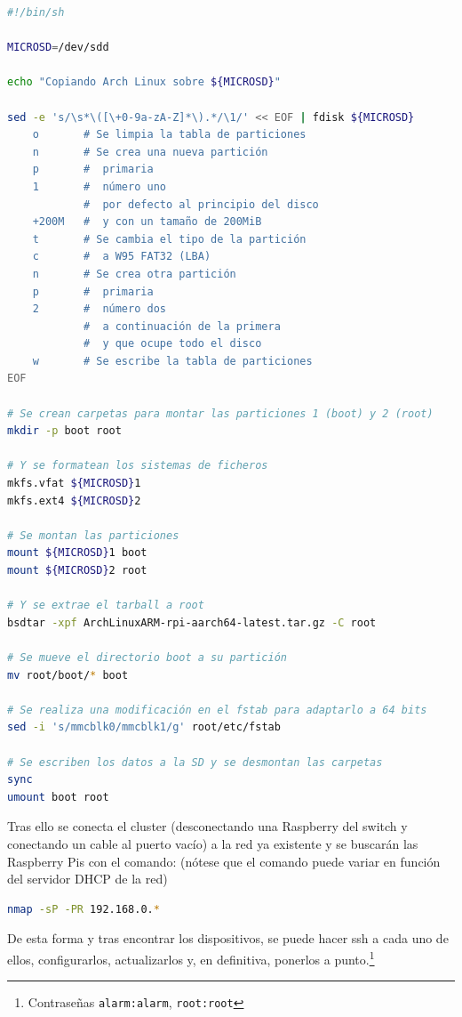 \begin{lstlisting}[language=bash]
#!/bin/sh

MICROSD=/dev/sdd

echo "Copiando Arch Linux sobre ${MICROSD}"

sed -e 's/\s*\([\+0-9a-zA-Z]*\).*/\1/' << EOF | fdisk ${MICROSD}
    o       # Se limpia la tabla de particiones
    n       # Se crea una nueva partición
    p       #  primaria
    1       #  número uno
            #  por defecto al principio del disco
    +200M   #  y con un tamaño de 200MiB
    t       # Se cambia el tipo de la partición
    c       #  a W95 FAT32 (LBA)
    n       # Se crea otra partición
    p       #  primaria
    2       #  número dos
            #  a continuación de la primera
            #  y que ocupe todo el disco
    w       # Se escribe la tabla de particiones
EOF

# Se crean carpetas para montar las particiones 1 (boot) y 2 (root)
mkdir -p boot root

# Y se formatean los sistemas de ficheros
mkfs.vfat ${MICROSD}1
mkfs.ext4 ${MICROSD}2

# Se montan las particiones
mount ${MICROSD}1 boot
mount ${MICROSD}2 root

# Y se extrae el tarball a root
bsdtar -xpf ArchLinuxARM-rpi-aarch64-latest.tar.gz -C root

# Se mueve el directorio boot a su partición
mv root/boot/* boot

# Se realiza una modificación en el fstab para adaptarlo a 64 bits
sed -i 's/mmcblk0/mmcblk1/g' root/etc/fstab

# Se escriben los datos a la SD y se desmontan las carpetas
sync
umount boot root
\end{lstlisting}

Tras ello se conecta el cluster (desconectando una Raspberry del switch y conectando un cable al puerto vacío) a la red ya existente y se buscarán las Raspberry Pis con el comando: (nótese que el comando puede variar en función del servidor DHCP de la red)

\begin{lstlisting}[language=bash]
nmap -sP -PR 192.168.0.*
\end{lstlisting}

De esta forma y tras encontrar los dispositivos, se puede hacer ssh a cada uno de ellos, configurarlos, actualizarlos y, en definitiva, ponerlos a punto.\footnote{Contraseñas \texttt{alarm:alarm}, \texttt{root:root}}

